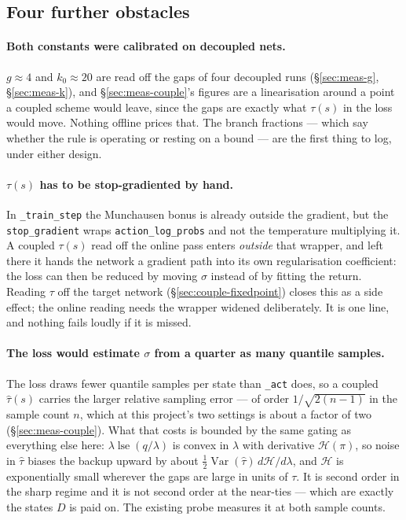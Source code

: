 \documentclass{article}
\newcommand{\h}{\mathcal{H}}
\DeclareMathOperator{\lse}{lse}
\DeclareMathOperator{\Var}{Var}
\newcommand{\srank}{\sigma}
\begin{document}
\subsection{Four further obstacles}
\label{sec:couple-obstacles}

\paragraph{Both constants were calibrated on decoupled nets.} $g \approx 4$ and $k_0 \approx 20$
are read off the gaps of four decoupled runs (\S\ref{sec:meas-g}, \S\ref{sec:meas-k}), and
\S\ref{sec:meas-couple}'s figures are a linearisation around a point a coupled scheme would
leave, since the gaps are exactly what $\tau(s)$ in the loss would move. Nothing offline prices
that. The branch fractions --- which say whether the rule is operating or resting on a bound ---
are the first thing to log, under either design.

\paragraph{$\tau(s)$ has to be stop-gradiented by hand.} In \texttt{\_train\_step} the Munchausen
bonus is already outside the gradient, but the \texttt{stop\_gradient} wraps
\texttt{action\_log\_probs} and not the temperature multiplying it. A coupled $\tau(s)$ read off
the online pass enters \emph{outside} that wrapper, and left there it hands the network a
gradient path into its own regularisation coefficient: the loss can then be reduced by moving
$\srank$ instead of by fitting the return. Reading $\tau$ off the target network
(\S\ref{sec:couple-fixedpoint}) closes this as a side effect; the online reading needs the
wrapper widened deliberately. It is one line, and nothing fails loudly if it is missed.

\paragraph{The loss would estimate $\srank$ from a quarter as many quantile samples.}
The loss draws fewer quantile samples per state than \texttt{\_act} does, so a coupled
$\hat\tau(s)$ carries the larger relative sampling error --- of order $1/\sqrt{2(n-1)}$ in the
sample count $n$, which at this project's two settings is about a factor of two
(\S\ref{sec:meas-couple}). What that costs is bounded by the same gating as
everything else here: $\lambda\lse(q/\lambda)$ is convex in $\lambda$ with derivative $\h(\pi)$,
so noise in $\hat\tau$ biases the backup upward by about $\frac12\Var(\hat\tau)\,d\h/d\lambda$,
and $\h$ is exponentially small wherever the gaps are large in units of $\tau$. It is second
order in the sharp regime and it is not second order at the near-ties --- which are exactly the
states $D$ is paid on. The existing probe measures it at both sample counts.
\end{document}

